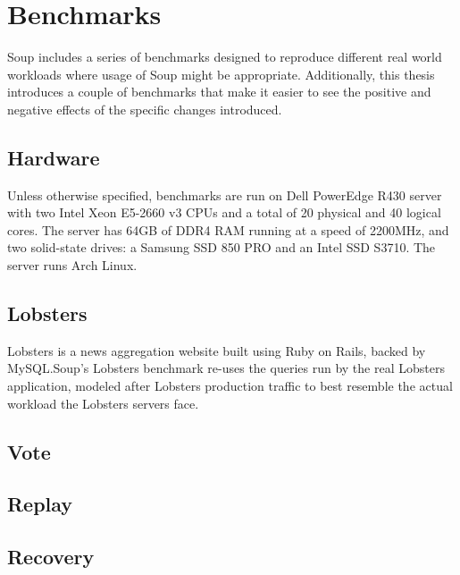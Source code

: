 \chapter{Benchmarks}\label{chap:benchmarks}

Soup includes a series of benchmarks designed to reproduce different real world
workloads where usage of Soup might be appropriate. Additionally, this thesis
introduces a couple of benchmarks that make it easier to see the positive and
negative effects of the specific changes introduced.

\section{Hardware}

Unless otherwise specified, benchmarks are run on Dell PowerEdge R430 server
with two Intel Xeon E5-2660 v3 CPUs and a total of 20 physical and 40 logical
cores. The server has 64GB of DDR4 RAM running at a speed of 2200MHz, and two
solid-state drives: a Samsung SSD 850 PRO and an Intel SSD S3710. The server
runs Arch Linux.

\section{Lobsters}

Lobsters is a news aggregation website built using Ruby
on Rails, backed by MySQL.\@ Soup's Lobsters benchmark re-uses the queries run
by the real Lobsters application, modeled after Lobsters production traffic to
best resemble the actual workload the Lobsters servers face.

\section{Vote}
\section{Replay}
\section{Recovery}
